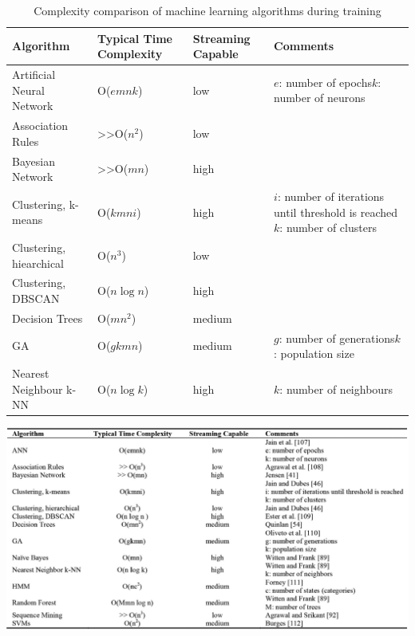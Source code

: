 \begin{table}
    \centering
    \begin{tabular}{*{4}{|m{.2\textwidth}}|}
    
    \hline
    \textbf{Algorithm} & \textbf{Typical Time Complexity} & \textbf{Streaming Capable} & \textbf{Comments}\\
    \hline\hline
    
    Artificial Neural Network & O($emnk$) & low & $e$: number of epochs\newline $k$: number of neurons\\
    \hline
    Association Rules & >>O($n^2$) & low &\\
    \hline
    Bayesian Network & >>O($mn$) & high &\\
    \hline
    Clustering, k-means & O($kmni$) & high & $i$: number of iterations until threshold is reached\newline $k$: number of clusters\\
    \hline
    Clustering, hiearchical & O($n^3$) & low &\\
    \hline
    Clustering, DBSCAN & O($n \log n$) & high &\\
    \hline
    Decision Trees & O($mn^2$) & medium &\\
    \hline
    GA & O($gkmn$) & medium & $g$: number of generations\newline $k$: population size\\
    \hline
    Nearest Neighbour k-NN & O($n \log k$) & high & $k$: number of neighbours\\
    \hline
    \end{tabular}
    \caption{Complexity comparison of machine learning algorithms during training \citep{Buczak2016}}
    \label{tab:algo_comparison}
\end{table}

\begin{table}
    \centering
    \includegraphics[width = \textwidth]{img/parts/introduction/Algorithm Comparison.png}
\end{table}

